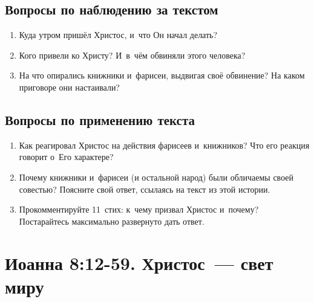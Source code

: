 \documentclass[a4paper,12pt]{article}
\begin{document}
\subsection*{Вопросы по наблюдению за текстом}
\begin{enumerate}
    \item Куда утром пришёл Христос, и~что Он начал делать? 
    
    \myline
    
    \myline
    \item Кого привели ко Христу? И~в~чём обвиняли этого человека? 
    
    \myline
    
    \myline
    \item На что опирались книжники и~фарисеи, выдвигая своё обвинение? На каком приговоре они настаивали? 
    
    \myline
    
    \myline
\end{enumerate}

\subsection*{Вопросы по применению текста} 
\begin{enumerate}
    \item Как реагировал Христос на действия фарисеев и~книжников? Что его реакция говорит о~Его характере? 
    
    \myline
    
    \myline
    \item Почему книжники и~фарисеи (и остальной народ) были обличаемы своей совестью? Поясните свой ответ, ссылаясь на текст из этой истории. 
    
    \myline
    
    \myline
    \item Прокомментируйте 11~стих: к~чему призвал Христос и~почему? Постарайтесь максимально развернуто дать ответ. 
    
    \myline
    
    \myline
\end{enumerate}



\section{Иоанна 8:12-59. Христос~--- свет миру}
\end{document}
